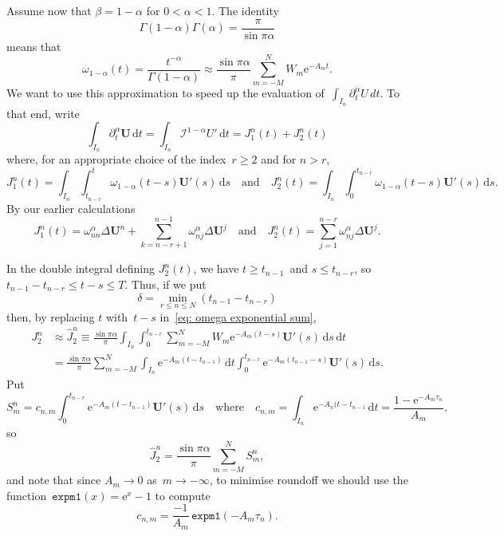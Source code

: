 \documentclass[a4paper,12pt]{article}
\newcommand{\bs}[1]{\boldsymbol{#1}}
\newcommand{\ud}{\mathrm{d}}
\newcommand{\ue}{\mathrm{e}}
\begin{document}
Assume now that $\beta=1-\alpha$ for $0<\alpha<1$.  The identity
\[
\Gamma(1-\alpha)\Gamma(\alpha)=\frac{\pi}{\sin\pi\alpha}
\]
means that
\begin{equation}\label{eq: omega exponential sum}
\omega_{1-\alpha}(t)=\frac{t^{-\alpha}}{\Gamma(1-\alpha)}
    \approx\frac{\sin\pi\alpha}{\pi}\sum_{m=-M}^NW_m\ue^{-A_mt}.
\end{equation}
We want to use this approximation to speed up the evaluation
of~$\int_{I_n}\partial_t^\alpha U\,dt$.  To that end, write
\[
\int_{I_n}\partial_t^\alpha\bs{U}\,\ud t
    =\int_{I_n}\mathcal{I}^{1-\alpha}U'\,\ud t=J^n_1(t)+J^n_2(t)
\]
where, for an appropriate choice of the index~$r\ge2$ and for $n>r$,
\[
J^n_1(t)=\int_{I_n}\int_{t_{n-r}}^t\omega_{1-\alpha}(t-s)\bs{U}'(s)\,\ud s
\quad\text{and}\quad
J^n_2(t)=\int_{I_n}\int_0^{t_{n-r}}\omega_{1-\alpha}(t-s)\bs{U}'(s)\,\ud s.
\]
By our earlier calculations
\[
J_1^n(t)=\omega^\alpha_{nn}\Delta\bs{U}^n+\sum_{k=n-r+1}^{n-1}
    \omega^\alpha_{nj}\Delta\bs{U}^j
\quad\text{and}\quad
J_2^n(t)=\sum_{j=1}^{n-r}\omega^\alpha_{nj}\Delta\bs{U}^j.
\]

In the double integral defining $J^n_2(t)$, we have $t\ge t_{n-1}$~and
$s\le t_{n-r}$, so $t_{n-1}-t_{n-r}\le t-s\le T$.  Thus, if we put
\[
\delta=\min_{r\le n\le N}(t_{n-1}-t_{n-r})
\]
then, by replacing $t$ with~$t-s$ in~\eqref{eq: omega exponential sum},
\begin{align*}
J_2^n&\approx \hat J_2^n\equiv\frac{\sin\pi\alpha}{\pi}\int_{I_n}
    \int_0^{t_{n-r}}\sum_{m=-M}^N W_m\ue^{-A_m(t-s)}\bs{U}'(s)\,\ud s\,\ud t\\
    &=\frac{\sin\pi\alpha}{\pi}\sum_{m=-M}^N
    \int_{I_n}\ue^{-A_m(t-t_{n-1})}\,\ud t
    \int_0^{t_{n-r}}\ue^{-A_m(t_{n-1}-s)}\bs{U}'(s)\,\ud s.
\end{align*}
Put
\[
S^n_m= c_{n,m}\int_0^{t_{n-r}}\ue^{-A_m(t-t_{n-1})}\bs{U}'(s)\,\ud s
\quad\text{where}\quad
c_{n,m}=\int_{I_n}\ue^{-A_n(t-t_{n-1}}\,\ud t=\frac{1-\ue^{-A_m\tau_n}}{A_m},
\]
so
\[
\hat J^n_2=\frac{\sin\pi\alpha}{\pi}\sum_{m=-M}^N S^n_m,
\]
and note that since $A_m\to0$ as~$m\to-\infty$, to minimise roundoff we should
use the function~$\mathtt{expm1}(x)=\ue^x-1$ to compute
\[
c_{n,m}=\frac{-1}{A_m}\,\mathtt{expm1}(-A_m\tau_n).
\]
\end{document}
